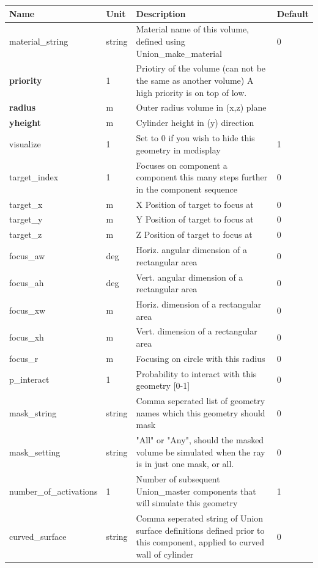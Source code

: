 \begin{longtable}{p{}p{}p{}p{}}
\toprule
\textbf{Name} & \textbf{Unit} & \textbf{Description} & \textbf{Default} \\
\midrule
\endhead
material\_string & string & Material name of this volume, defined using Union\_make\_material & 0 \\
\textbf{priority} & 1 & Priotiry of the volume (can not be the same as another volume) A high priority is on top of low. &  \\
\textbf{radius} & m & Outer radius volume in (x,z) plane &  \\
\textbf{yheight} & m & Cylinder height in (y) direction &  \\
visualize & 1 & Set to 0 if you wish to hide this geometry in mcdisplay & 1 \\
target\_index & 1 & Focuses on component a component this many steps further in the component sequence & 0 \\
target\_x & m & X Position of target to focus at & 0 \\
target\_y & m & Y Position of target to focus at & 0 \\
target\_z & m & Z Position of target to focus at & 0 \\
focus\_aw & deg & Horiz. angular dimension of a rectangular area & 0 \\
focus\_ah & deg & Vert. angular dimension of a rectangular area & 0 \\
focus\_xw & m & Horiz. dimension of a rectangular area & 0 \\
focus\_xh & m & Vert. dimension of a rectangular area & 0 \\
focus\_r & m & Focusing on circle with this radius & 0 \\
p\_interact & 1 & Probability to interact with this geometry [0-1] & 0 \\
mask\_string & string & Comma seperated list of geometry names which this geometry should mask & 0 \\
mask\_setting & string & "All" or "Any", should the masked volume be simulated when the ray is in just one mask, or all. & 0 \\
number\_of\_activations & 1 & Number of subsequent Union\_master components that will simulate this geometry & 1 \\
curved\_surface & string & Comma seperated string of Union surface definitions defined prior to this component, applied to curved wall of cylinder & 0 \\

\end{longtable}
